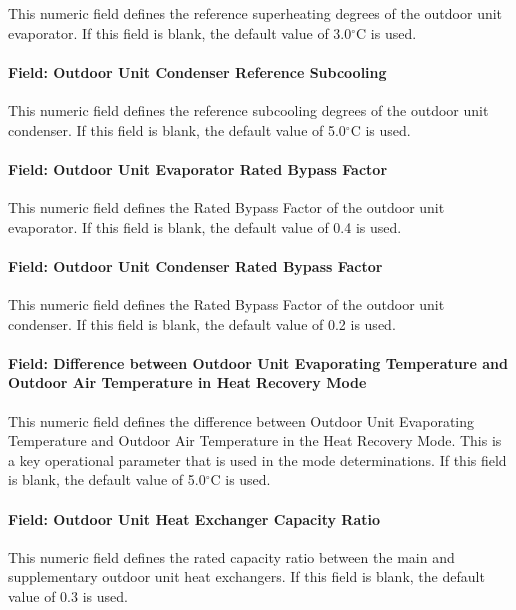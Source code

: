 This numeric field defines the reference superheating degrees of the outdoor unit evaporator. If this field is blank, the default value of 3.0$^\circ$C is used.

\paragraph{Field: Outdoor Unit Condenser Reference Subcooling}

This numeric field defines the reference subcooling degrees of the outdoor unit condenser. If this field is blank, the default value of 5.0$^\circ$C is used.

\paragraph{Field: Outdoor Unit Evaporator Rated Bypass Factor}

This numeric field defines the Rated Bypass Factor of the outdoor unit evaporator. If this field is blank, the default value of 0.4 is used.

\paragraph{Field: Outdoor Unit Condenser Rated Bypass Factor}

This numeric field defines the Rated Bypass Factor of the outdoor unit condenser. If this field is blank, the default value of 0.2 is used.

\paragraph{Field: Difference between Outdoor Unit Evaporating Temperature and Outdoor Air Temperature in Heat Recovery Mode}

This numeric field defines the difference between Outdoor Unit Evaporating Temperature and Outdoor Air Temperature in the Heat Recovery Mode. This is a key operational parameter that is used in the mode determinations. If this field is blank, the default value of 5.0$^\circ$C is used.

\paragraph{Field: Outdoor Unit Heat Exchanger Capacity Ratio}

This numeric field defines the rated capacity ratio between the main and supplementary outdoor unit heat exchangers. If this field is blank, the default value of 0.3 is used.


